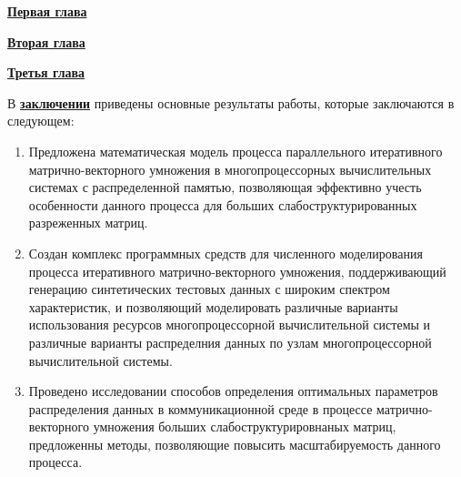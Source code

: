 \underline{\textbf{Первая глава}} 

\underline{\textbf{Вторая глава}}  

\underline{\textbf{Третья глава}}  

В \underline{\textbf{заключении}} приведены основные результаты работы, которые заключаются в следующем:
\begin{enumerate}
 \item Предложена математическая модель процесса параллельного итеративного матрично-векторного умножения в
   многопроцессорных вычислительных системах с распределенной памятью, позволяющая эффективно учесть особенности данного
   процесса для больших слабоструктурированных разреженных матриц.  
 \item  Создан комплекс программных средств для численного моделирования процесса итеративного матрично-векторного умножения, поддерживающий  генерацию синтетических тестовых данных с широким спектром характеристик, и позволяющий моделировать различные
   варианты использования ресурсов многопроцессорной вычислительной системы и различные варианты распределния данных по
   узлам многопроцессорной вычислительной системы.

 \item   Проведено исследовании способов определения оптимальных параметров распределения данных в коммуникационной среде в процессе
   матрично-векторного умножения больших слабоструктурировнаных матриц, предложенны методы, позволяющие повысить
   масштабируемость данного процесса.
 
\end{enumerate}


\renewcommand{\refname}{\Large Публикации автора по теме диссертации}
\nocite{*}

